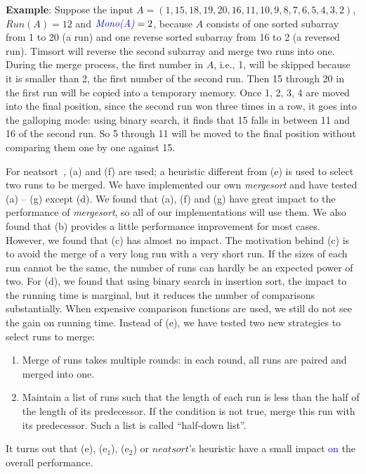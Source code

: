 \documentclass[AMA,STIX1COL]{WileyNJD-v2}
\newcommand {\mono}{\emph{\textcolor{blue}{Mono(A)}}}
\newcommand{\msort}{\emph{mergesort }}
\newcommand{\msortn}{\emph{mergesort}}
\begin{document}
\textbf{Example}: Suppose the input $A = (1, 15, 18, 19, 20, 16, 11, 10, 9, 8, 7, 6, 5, 4, 3, 2)$, $Run(A) = 12$ and $\mono = 2$, because $A$ consists of one sorted subarray from 1 to 20 (a run) and one reverse sorted subarray from 16 to 2 (a reversed run).
Timsort will reverse the second subarray and merge two runs into one. 
During the merge process, the first number in $A$, i.e., 1, will be skipped because it is smaller than 2, the first number of the second run. 
Then 15 through 20 in the first run will be copied into a temporary memory. 
Once 1, 2, 3, 4 are moved into the final position, since the second run won three times in a row,  it goes into the galloping mode: using binary search, it finds that 15 falls in between 11 and 16 of the second run. 
So 5 through 11 will be moved to the final position without comparing them one by one against 15. 

For neatsort~\cite{la2014neatsort}, (a) and (f) are used; a heuristic different from (e) is used to select two runs to be merged. 
We have implemented our own \msort and have tested (a) – (g) except (d). We found that (a), (f) and (g) have great impact to the performance of \msortn, so all of our implementations will use them. 
We also found that (b) provides a little performance improvement for most cases. 
However, we found that (c) has almost no impact. 
The motivation behind (c) is to avoid the merge of a very long run with a very short run. 
If the sizes of each run cannot be the same, the number of runs can hardly be an expected power of two. 
For (d), we found that using binary search in insertion sort, the impact to the running time is marginal, but it reduces the number of comparisons substantially. 
When expensive comparison functions are used, we still do not see the gain on running time. Instead of (e), we have tested two new strategies to select runs to merge:
\begin{enumerate}[(e$_1$)]
\item Merge of runs takes multiple rounds: in each round, all runs are paired and merged into one.
\item Maintain a list of runs such that the length of each run is less than the half of the length of its predecessor. If the condition is not true, merge this run with its predecessor. Such a list is called “half-down list”.
\end{enumerate}

It turns out that (e), (e$_1$), (e$_2$) or $neatsort$’s heuristic have a small impact \textcolor{blue}{on} the overall performance.
\end{document}
